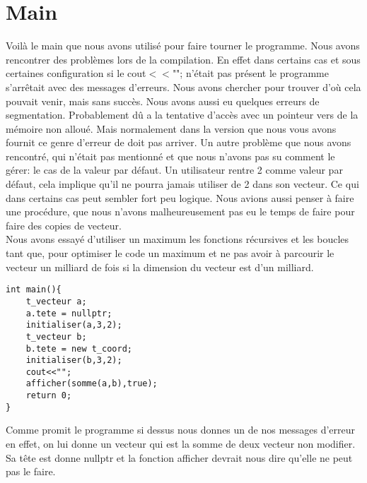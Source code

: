\documentclass[a4paper,11pt,final]{article}
\begin{document}
\section{Main}
Voilà le main que nous avons utilisé pour faire tourner le programme. Nous avons rencontrer des problèmes lors de la compilation. En effet dans certains cas et sous certaines configuration si le cout$<<$""; n'était pas présent le programme s'arrêtait avec des messages d'erreurs. Nous avons chercher pour trouver d'où cela pouvait venir, mais sans succès. Nous avons aussi eu quelques erreurs de segmentation. Probablement dû a la tentative d'accès avec un pointeur vers de la mémoire non alloué. Mais normalement dans la version que nous vous avons fournit ce genre d'erreur de doit pas arriver. Un autre problème que nous avons rencontré, qui n'était pas mentionné et que nous n'avons pas su comment le gérer: le cas de la valeur par défaut. Un utilisateur rentre 2 comme valeur par défaut, cela implique qu'il ne pourra jamais utiliser de 2 dans son vecteur. Ce qui dans certains cas peut sembler fort peu logique. Nous avions aussi penser à faire une procédure, que nous n'avons malheureusement pas eu le temps de faire pour faire des copies de vecteur. \\
Nous avons essayé d'utiliser un maximum les fonctions récursives et les boucles tant que, pour optimiser le code un maximum et ne pas avoir à parcourir le vecteur un milliard de fois si la dimension du vecteur est d'un milliard. \\
\begin{verbatim}
int main(){
    t_vecteur a;
    a.tete = nullptr;
    initialiser(a,3,2);
    t_vecteur b;
    b.tete = new t_coord;
    initialiser(b,3,2);
    cout<<"";
    afficher(somme(a,b),true);
    return 0;
}
\end{verbatim}
Comme promit le programme si dessus nous donnes un de nos messages d'erreur en effet, on lui donne un vecteur qui est la somme de deux vecteur non modifier. Sa tête est donne nullptr et la fonction afficher devrait nous dire qu'elle ne peut pas le faire.\\
\end{document}
